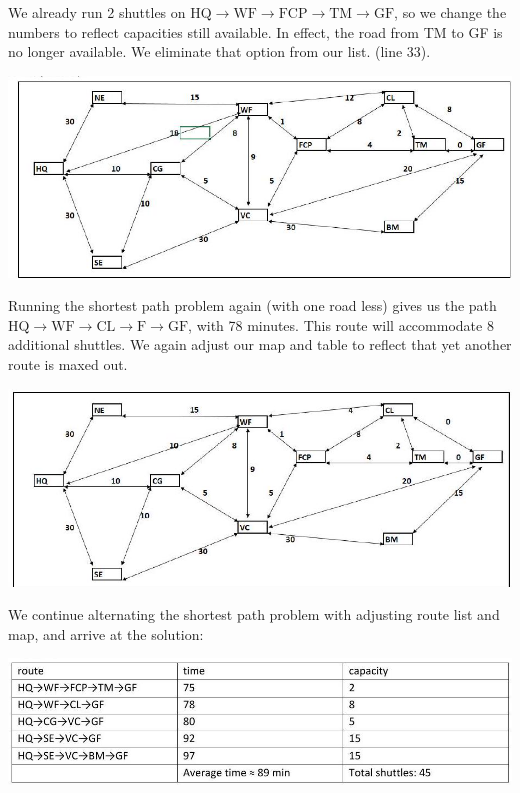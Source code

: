 \documentclass[10pt]{article}
\begin{document}
We already run 2 shuttles on $\mathrm{HQ} \rightarrow \mathrm{WF} \rightarrow \mathrm{FCP} \rightarrow \mathrm{TM} \rightarrow \mathrm{GF}$, so we change the numbers to reflect capacities still available. In effect, the road from TM to GF is no longer available. We eliminate that option from our list. (line 33).

\includegraphics[max width=\textwidth]{2022_07_05_5945264bba2a5f6ba667g-49(1)}

Running the shortest path problem again (with one road less) gives us the path $\mathrm{HQ} \rightarrow \mathrm{WF} \rightarrow \mathrm{CL} \rightarrow \mathrm{F} \rightarrow \mathrm{GF}$, with 78 minutes. This route will accommodate 8 additional shuttles. We again adjust our map and table to reflect that yet another route is maxed out.

\includegraphics[max width=\textwidth]{2022_07_05_5945264bba2a5f6ba667g-49(2)}

We continue alternating the shortest path problem with adjusting route list and map, and arrive at the solution:

\includegraphics[max width=\textwidth]{2022_07_05_5945264bba2a5f6ba667g-50}
\end{document}

